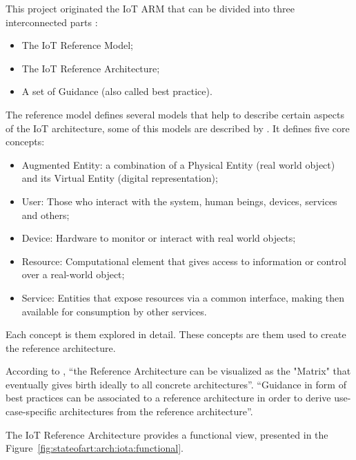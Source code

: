 This project originated the \gls{IoT} \gls{ARM} that can be divided into three interconnected parts \parencite{krvco2014designing}:

\begin{itemize}
    \item The IoT Reference Model;
    \item The IoT Reference Architecture;
    \item A set of Guidance (also called best practice).
\end{itemize}

The reference model defines several models that help to describe certain aspects of the \gls{IoT} architecture, some of this models are described by \cite{6682101}. It defines five core concepts:

\begin{itemize}
    \item Augmented Entity: a combination of a Physical Entity (real world object) and its Virtual Entity (digital representation);
    \item User: Those who interact with the system, human beings, devices, services and others;
    \item Device: Hardware to monitor or interact with real world objects;
    \item Resource: Computational element that gives access to information or control over a real-world object;
    \item Service: Entities that expose resources via a common interface, making then available for consumption by other services.
\end{itemize}

Each concept is them explored in detail. These concepts are them used to create the reference architecture.

According to , ``the Reference Architecture can be visualized as the "Matrix" that eventually gives birth ideally to all concrete architectures''. ``Guidance in form of best practices can be associated to a reference architecture in order to derive use-case-specific architectures from the reference architecture''.

The IoT Reference Architecture provides a functional view, presented in the Figure~\ref{fig:stateofart:arch:iota:functional}.

